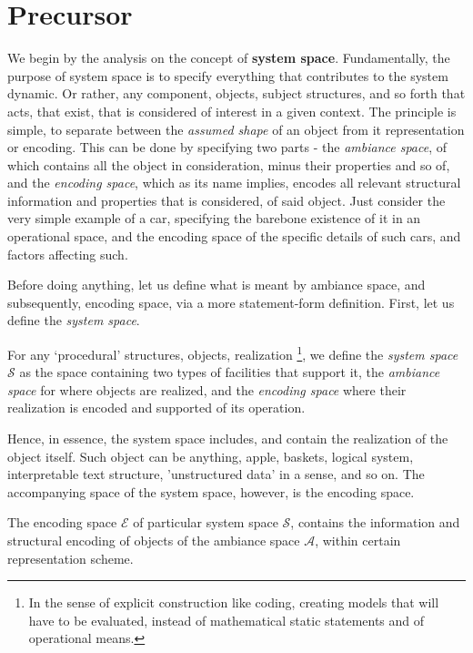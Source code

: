 \section{Precursor}

We begin by the analysis on the concept of \textbf{system space}. Fundamentally, the purpose of system space is to specify everything that contributes to the system dynamic. Or rather, any component, objects, subject structures, and so forth that acts, that exist, that is considered of interest in a given context. The principle is simple, to separate between the \textit{assumed shape} of an object from it representation or encoding. This can be done by specifying two parts - the \textit{ambiance space}, of which contains all the object in consideration, minus their properties and so of, and the \textit{encoding space}, which as its name implies, encodes all relevant structural information and properties that is considered, of said object. Just consider the very simple example of a car, specifying the barebone existence of it in an operational space, and the encoding space of the specific details of such cars, and factors affecting such. 

Before doing anything, let us define what is meant by ambiance space, and subsequently, encoding space, via a more statement-form definition. First, let us define the \textit{system space}. 
\begin{definition}
  For any `procedural' structures, objects, realization \footnote{In the sense of explicit construction like coding, creating models that will have to be evaluated, instead of mathematical static statements and of operational means.}, we define the \textit{system space} $\mathcal{S}$ as the space containing two types of facilities that support it, the \textit{ambiance space} for where objects are realized, and the \textit{encoding space} where their realization is encoded and supported of its operation. 
\end{definition}

Hence, in essence, the system space includes, and contain the realization of the object itself. Such object can be anything, apple, baskets, logical system, interpretable text structure, 'unstructured data' in a sense, and so on. The accompanying space of the system space, however, is the encoding space. 

\begin{definition}
    The encoding space $\mathcal{E}$ of particular system space $\mathcal{S}$, contains the information and structural encoding of objects of the ambiance space $\mathcal{A}$, within certain representation scheme. 
\end{definition}

